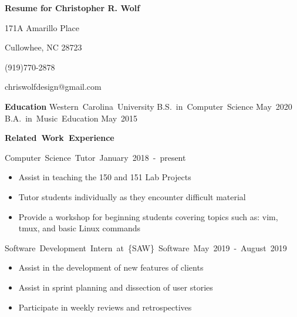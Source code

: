 \documentclass[12pt]{letter}
\begin{document}
    \thispagestyle{empty} %

    \centerline{\textbf{\large Resume for Christopher R. Wolf}}
    \centerline{171A Amarillo Place}
    \centerline{Cullowhee, NC 28723}
    \centerline{(919)770-2878}
    \centerline{chriswolfdesign@gmail.com}

    \vspace{10 mm}
    \textbf{\large Education}
    \vspace{3 mm}
    \hbox{Western Carolina University}
    \linebreak
    \hbox{B.S. in Computer Science} \hspace{200pt} \hbox{May 2020}
    \linebreak
    \hbox{B.A. in Music Education} \hspace{230pt} \hbox{May 2015}

    \vspace {10 mm}
    \hbox{\textbf{\large {Related Work Experience}}}
    \vspace{3 mm}

    \hbox{Computer Science Tutor \hspace{185pt} January 2018 - present}
    \vspace{-5 mm}
    \begin{itemize}
        \itemsep 0em
        \item Assist in teaching the 150 and 151 Lab Projects
        \item Tutor students individually as they encounter difficult material
        \item Provide a workshop for beginning students covering topics such 
            as: vim, tmux, and basic Linux commands
    \end{itemize}

    \vspace{2 mm}
    \hbox{Software Development Intern at \{SAW\} Software \hspace{50pt}
        May 2019 - August 2019}
    \vspace{-5 mm}
    \begin{itemize}
        \itemsep 0em
        \item Assist in the development of new features of clients
        \item Assist in sprint planning and dissection of user stories
        \item Participate in weekly reviews and retrospectives
    \end{itemize}
\end{document}
